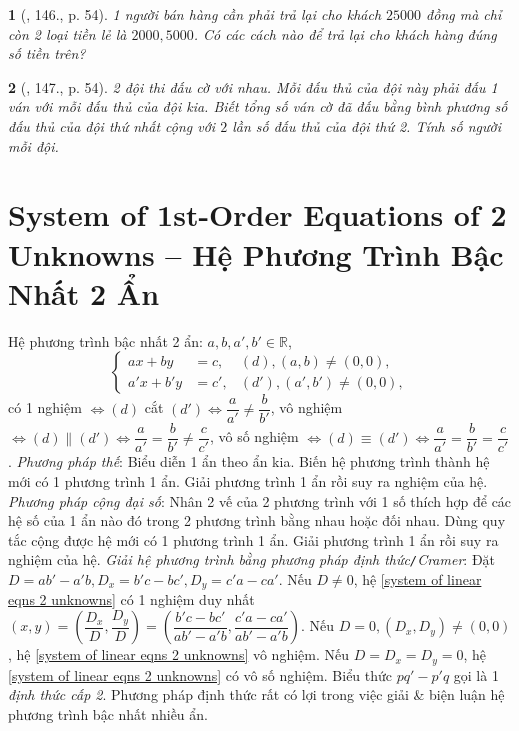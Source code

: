 \documentclass{article}
\newtheorem{baitoan}{}
\begin{document}
\begin{baitoan}[\cite{Tuyen_Toan_9_old}, 146., p. 54]
	1 người bán hàng cần phải trả lại cho khách $25000$ đồng mà chỉ còn 2 loại tiền lẻ là $2000,5000$. Có các cách nào để trả lại cho khách hàng đúng số tiền trên?
\end{baitoan}

\begin{baitoan}[\cite{Tuyen_Toan_9_old}, 147., p. 54]
	2 đội thi đấu cờ với nhau. Mỗi đấu thủ của đội này phải đấu 1 ván với mỗi đấu thủ của đội kia. Biết tổng số ván cờ đã đấu bằng bình phương số đấu thủ của đội thứ nhất cộng với $2$ lần số đấu thủ của đội thứ 2. Tính số người mỗi đội.
\end{baitoan}


\section{System of 1st-Order Equations of 2 Unknowns -- Hệ Phương Trình Bậc Nhất 2 Ẩn}
 Hệ phương trình bậc nhất 2 ẩn: $a,b,a',b'\in\mathbb{R}$,
\begin{equation}
	\label{system of linear eqns 2 unknowns}
	\boxed{\left\{\begin{split}
		ax + by &= c, &(d),(a,b)\ne(0,0),\\
		a'x + b'y &= c', &(d'),(a',b')\ne(0,0),
	\end{split}\right.}
\end{equation}
có 1 nghiệm $\Leftrightarrow(d)$ cắt $(d')\Leftrightarrow\dfrac{a}{a'}\ne\dfrac{b}{b'}$, vô nghiệm $\Leftrightarrow(d)\parallel(d')\Leftrightarrow\dfrac{a}{a'} = \dfrac{b}{b'}\ne\dfrac{c}{c'}$, vô số nghiệm $\Leftrightarrow(d)\equiv(d')\Leftrightarrow\dfrac{a}{a'} = \dfrac{b}{b'} = \dfrac{c}{c'}$.  \textit{Phương pháp thế}: Biểu diễn 1 ẩn theo ẩn kia. Biến hệ phương trình thành hệ mới có 1 phương trình 1 ẩn. Giải phương trình 1 ẩn rồi suy ra nghiệm của hệ.  \textit{Phương pháp cộng đại số}: Nhân 2 vế của 2 phương trình với 1 số thích hợp để các hệ số của 1 ẩn nào đó trong 2 phương trình bằng nhau hoặc đối nhau. Dùng quy tắc cộng được hệ mới có 1 phương trình 1 ẩn. Giải phương trình 1 ẩn rồi suy ra nghiệm của hệ.  \textit{Giải hệ phương trình bằng phương pháp định thức{\tt/}Cramer}: Đặt $D = ab' - a'b,D_x = b'c - bc',D_y = c'a - ca'$. Nếu $D\ne0$, hệ \eqref{system of linear eqns 2 unknowns} có 1 nghiệm duy nhất $(x,y) = \left(\dfrac{D_x}{D},\dfrac{D_y}{D}\right) = \left(\dfrac{b'c - bc'}{ab' - a'b},\dfrac{c'a - ca'}{ab' - a'b}\right)$. Nếu $D = 0,(D_x,D_y)\ne(0,0)$, hệ \eqref{system of linear eqns 2 unknowns} vô nghiệm. Nếu $D = D_x = D_y = 0$, hệ \eqref{system of linear eqns 2 unknowns} có vô số nghiệm. Biểu thức $pq' - p'q$ gọi là 1 \textit{định thức cấp 2}. Phương pháp định thức rất có lợi trong việc giải \& biện luận hệ phương trình bậc nhất nhiều ẩn.\\
\end{document}
